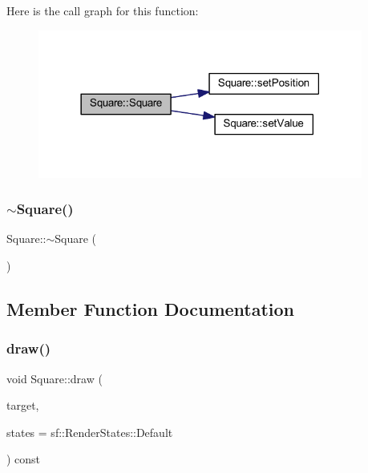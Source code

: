 Here is the call graph for this function\+:
\nopagebreak
\begin{figure}[H]
\begin{center}
\leavevmode
\includegraphics[width=302pt]{class_square_a53fbf885454472fc818f541ecae5a80f_cgraph}
\end{center}
\end{figure}
\mbox{\label{class_square_a90af7ce1060cff7b717ceddb333846b8}} 
\subsubsection{\texorpdfstring{$\sim$\+Square()}{~Square()}}
{\footnotesize\ttfamily Square\+::$\sim$\+Square (\begin{DoxyParamCaption}{ }\end{DoxyParamCaption})}



\subsection{Member Function Documentation}
\mbox{\label{class_square_a6665fa34ce5e672a880a253b1a21fb78}} 
\subsubsection{\texorpdfstring{draw()}{draw()}}
{\footnotesize\ttfamily void Square\+::draw (\begin{DoxyParamCaption}\item[{sf\+::\+Render\+Target \&}]{target,  }\item[{sf\+::\+Render\+States}]{states = {\ttfamily sf\+:\+:RenderStates\+:\+:Default} }\end{DoxyParamCaption}) const\hspace{0.3cm}{\ttfamily [virtual]}}

